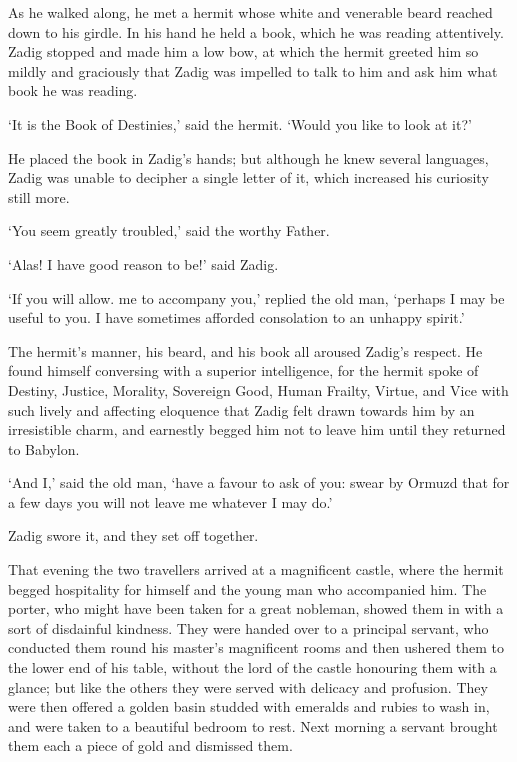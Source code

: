 \documentclass{article}
\begin{document}
\begin{center}
As he walked along, he met a hermit whose white and venerable beard reached down 
to his girdle. In his hand he held a book, which he was reading attentively. Zadig 
stopped and made him a low bow, at which the hermit greeted him so mildly and graciously 
that Zadig was impelled to talk to him and ask him what book he was reading. 

`It is the Book of Destinies,' said the hermit. `Would you like to look at it?' 

He placed the book in Zadig's hands; but although he knew several languages, Zadig 
was unable to decipher a single letter of it, which increased his curiosity still 
more. 

`You seem greatly troubled,' said the worthy Father. 

`Alas! I have good reason to be!' said Zadig. 

`If you will allow. me to accompany you,' replied the old man, `perhaps I may be 
useful to you. I have sometimes afforded consolation to an unhappy spirit.' 

The hermit's manner, his beard, and his book all aroused Zadig's respect. He found 
himself conversing with a superior intelligence, for the hermit spoke of Destiny, 
Justice, Morality, Sovereign Good, Human Frailty, Virtue, and Vice with such lively 
and affecting eloquence that Zadig felt drawn towards him by an irresistible charm, 
and earnestly begged him not to leave him until they returned to Babylon. 

`And I,' said the old man, `have a favour to ask of you: swear by Ormuzd that for 
a few days you will not leave me whatever I may do.' 

Zadig swore it, and they set off together. 

That evening the two travellers arrived at a magnificent castle, where the hermit 
begged hospitality for himself and the young man who accompanied him. The porter, 
who might have been taken for a great nobleman, showed them in with a sort of disdainful 
kindness. They were handed over to a principal servant, who conducted them round 
his master's magnificent rooms and then ushered them to the lower end of his table, 
without the lord of the castle honouring them with a glance; but like the others 
they were served with delicacy and profusion. They were then offered a golden basin 
studded with emeralds and rubies to wash in, and were taken to a beautiful bedroom 
to rest. Next morning a servant brought them each a piece of gold and dismissed 
them. 


\end{center}
\end{document}
